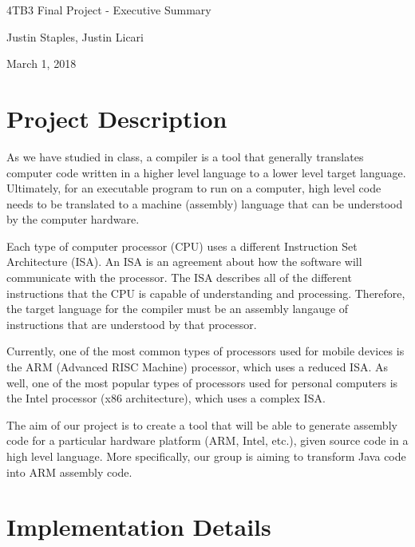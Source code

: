 \documentclass[11pt]{article}
\begin{document}
\begin{center}
	{\LARGE 4TB3 Final Project - Executive Summary}

	\bigskip

	Justin Staples, Justin Licari
	
	\bigskip

	March 1, 2018

\end{center}

\section{Project Description}

As we have studied in class, a compiler is a tool that generally translates computer code written in a higher level language to a lower level target language. Ultimately, for an executable program to run on a computer, high level code needs to be translated to a machine (assembly) language that can be understood by the computer hardware. 

Each type of computer processor (CPU) uses a different Instruction Set Architecture (ISA). An ISA is an agreement about how the software will communicate with the processor. The ISA describes all of the different instructions that the CPU is capable of understanding and processing. Therefore, the target language for the compiler must be an assembly langauge of instructions that are understood by that processor. 

Currently, one of the most common types of processors used for mobile devices is the ARM (Advanced RISC Machine) processor, which uses a reduced ISA. As well, one of the most popular types of processors used for personal computers is the Intel processor (x86 architecture), which uses a complex ISA. 

The aim of our project is to create a tool that will be able to generate assembly code for a particular hardware platform (ARM, Intel, etc.), given source code in a high level language. More specifically, our group is aiming to transform Java code into ARM assembly code. 

\section{Implementation Details}

The main feature of our implementation will be a program that accepts a potential Java program as input. This Java code will be sent through lexical and syntactic analysis. This will be done by first validating the source code against a grammar that describes the Java programming language (or at least an appreciable subset of it). Our current objective is to write our own recursive descent parser for such a language. Once a valid Java program is detected, our program will begin a code generation phase where the Java code is mapped to the appropriate ARM instructions. The resulting ARM instructions will then be written to an output file. In theory, this ARM code could then be run on a computer that has an ARM processor or that has access to an ARM virtual environment. 
\end{document}
